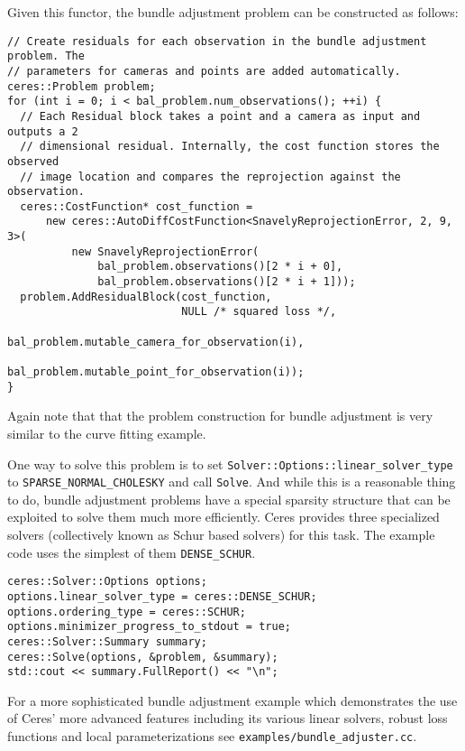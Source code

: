 Given this functor, the bundle adjustment problem can be constructed as follows:
\begin{verbatim}
// Create residuals for each observation in the bundle adjustment problem. The
// parameters for cameras and points are added automatically.
ceres::Problem problem;
for (int i = 0; i < bal_problem.num_observations(); ++i) {
  // Each Residual block takes a point and a camera as input and outputs a 2
  // dimensional residual. Internally, the cost function stores the observed
  // image location and compares the reprojection against the observation.
  ceres::CostFunction* cost_function =
      new ceres::AutoDiffCostFunction<SnavelyReprojectionError, 2, 9, 3>(
          new SnavelyReprojectionError(
              bal_problem.observations()[2 * i + 0],
              bal_problem.observations()[2 * i + 1]));
  problem.AddResidualBlock(cost_function,
                           NULL /* squared loss */,
                           bal_problem.mutable_camera_for_observation(i),
                           bal_problem.mutable_point_for_observation(i));
}
\end{verbatim}
Again note that that the problem construction for bundle adjustment is very similar to the curve fitting example.

One way to solve this problem is to set \texttt{Solver::Options::linear\_solver\_type} to \texttt{SPARSE\_NORMAL\_CHOLESKY} and call \texttt{Solve}. And while this is a reasonable thing to do, bundle adjustment problems have a special sparsity structure that can be exploited to solve them much more efficiently. Ceres provides three specialized solvers (collectively known as Schur based solvers) for this task. The example code uses the simplest of them \texttt{DENSE\_SCHUR}. 
\begin{verbatim}
ceres::Solver::Options options;
options.linear_solver_type = ceres::DENSE_SCHUR;
options.ordering_type = ceres::SCHUR;
options.minimizer_progress_to_stdout = true;
ceres::Solver::Summary summary;
ceres::Solve(options, &problem, &summary);
std::cout << summary.FullReport() << "\n";
\end{verbatim}

For a more sophisticated bundle adjustment example which demonstrates the use of Ceres' more advanced features including its  various linear solvers, robust loss functions and local parameterizations see \texttt{examples/bundle\_adjuster.cc}.